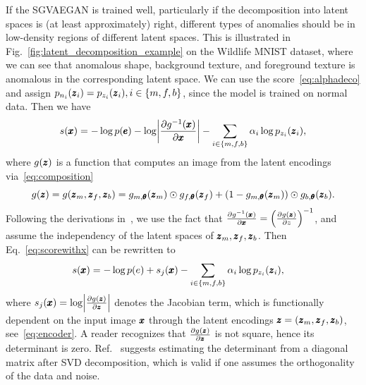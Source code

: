 If the SGVAEGAN is trained well, particularly if the decomposition into latent spaces is (at least approximately) right, different types of anomalies should be in low-density regions of different latent spaces. This is illustrated in Fig.~\ref{fig:latent_decomposition_example} on the Wildlife MNIST dataset, where we can see that anomalous shape, background texture, and foreground texture is anomalous in the corresponding latent space. We can use the score~\eqref{eq:alphadeco} and assign $p_{n_i}(\pmb{{z}}_i) = p_{z_i}(\pmb{{z}}_i), i \in \lbrace m,f,b \rbrace$, since the model is trained on normal data. Then we have
\begin{equation}
s(\vc{x}) = - \log p(\vc{e})  - \log\left\vert \frac{\partial g^{-1}(\vc{x})}{\partial \vc{x}}\right\vert -  \sum_{i\in\{m,f,b\}}\alpha_{i}\log p_{z_{i}}(\vc{z}_{i}),	
\label{eq:scorewithx}
\end{equation}
where $g(\pmb{{z}})$ is a function that computes an image from the latent encodings via~\eqref{eq:composition}
\begin{equation}
g(\pmb{{z}}) = g(\pmb{{z}}_m, \pmb{{z}}_f, \pmb{{z}}_b) = g_{m, \pmb{{\theta}}}(\pmb{{z}}_m) \odot g_{f, \pmb{{\theta}}}(\pmb{{z}}_f) + (1 - g_{m, \pmb{{\theta}}}(\pmb{{z}}_m)) \odot g_{b, \pmb{{\theta}}}(\pmb{{z}}_b).
\end{equation}
Following the derivations in~\cite{vsmidl2019anomaly}, we use the fact that $\frac{\partial g^{-1}(\vc{x})}{\partial \vc{x}} = \left( \frac{\partial g(\vc{z})}{\partial z} \right) ^{-1}$, and assume the independency of the latent spaces of $\pmb{{z}}_m, \pmb{{z}}_f, \pmb{{z}}_b$. Then Eq.~\eqref{eq:scorewithx} can be rewritten to 
\begin{align} \label{eq:scorejacodeco}	
s(\pmb{{x}}) & = - \log p(e)  + s_j(\pmb{{x}}) -  \sum_{i\in\{m,f,b\}} \alpha_{i}\log p_{z_{i}}(\pmb{{z}}_{i}),
\end{align}
where $s_j(\vc{x}) = \log \left\vert  \frac{\partial g(\vc{z})}{\partial \vc{z}}  \right\vert $ denotes the Jacobian term, which is functionally dependent on the input image $\pmb{{x}}$ through the latent encodings $\pmb{{z}} = (\pmb{{z}}_m, \pmb{{z}}_f, \pmb{{z}}_b)$, see~\eqref{eq:encoder}. A reader recognizes that $\frac{\partial g(\pmb{{z}})}{\partial \pmb{{z}}}$ is not square, hence its determinant is zero. Ref.~\cite{vsmidl2019anomaly} suggests estimating the determinant from a diagonal matrix after SVD decomposition, which is valid if one assumes the orthogonality of the data and noise.

